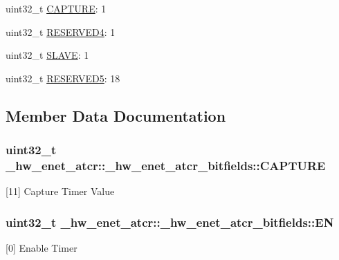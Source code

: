 \begin{DoxyCompactItemize}
\item 
uint32\+\_\+t \hyperlink{struct__hw__enet__atcr_1_1__hw__enet__atcr__bitfields_ae72e603aac020dc6972bae522234dbd6}{C\+A\+P\+T\+U\+RE}\+: 1
\item 
uint32\+\_\+t \hyperlink{struct__hw__enet__atcr_1_1__hw__enet__atcr__bitfields_af64a19432360bf6d27a853331302491e}{R\+E\+S\+E\+R\+V\+E\+D4}\+: 1
\item 
uint32\+\_\+t \hyperlink{struct__hw__enet__atcr_1_1__hw__enet__atcr__bitfields_aff287ce5cd48f785a20025dc55fcfc02}{S\+L\+A\+VE}\+: 1
\item 
uint32\+\_\+t \hyperlink{struct__hw__enet__atcr_1_1__hw__enet__atcr__bitfields_a3da7c88aa97c6bd32772e2c854f42890}{R\+E\+S\+E\+R\+V\+E\+D5}\+: 18
\end{DoxyCompactItemize}


\subsection{Member Data Documentation}
\subsubsection[{\texorpdfstring{C\+A\+P\+T\+U\+RE}{CAPTURE}}]{\setlength{\rightskip}{0pt plus 5cm}uint32\+\_\+t \+\_\+hw\+\_\+enet\+\_\+atcr\+::\+\_\+hw\+\_\+enet\+\_\+atcr\+\_\+bitfields\+::\+C\+A\+P\+T\+U\+RE}\hypertarget{struct__hw__enet__atcr_1_1__hw__enet__atcr__bitfields_ae72e603aac020dc6972bae522234dbd6}{}\label{struct__hw__enet__atcr_1_1__hw__enet__atcr__bitfields_ae72e603aac020dc6972bae522234dbd6}
\mbox{[}11\mbox{]} Capture Timer Value 
\subsubsection[{\texorpdfstring{EN}{EN}}]{\setlength{\rightskip}{0pt plus 5cm}uint32\+\_\+t \+\_\+hw\+\_\+enet\+\_\+atcr\+::\+\_\+hw\+\_\+enet\+\_\+atcr\+\_\+bitfields\+::\+EN}\hypertarget{struct__hw__enet__atcr_1_1__hw__enet__atcr__bitfields_a5eef6d3710dc498176062a10e95ed28d}{}\label{struct__hw__enet__atcr_1_1__hw__enet__atcr__bitfields_a5eef6d3710dc498176062a10e95ed28d}
\mbox{[}0\mbox{]} Enable Timer 
